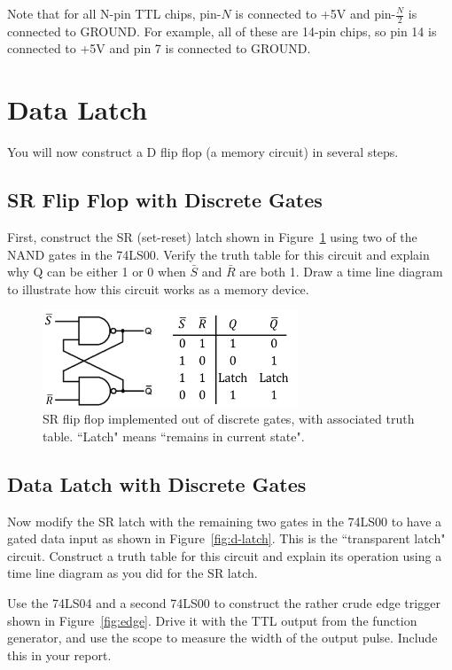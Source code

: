 \documentclass[12pt]{article}
\begin{document}
Note that for all N-pin TTL chips, pin-$N$ is connected to +5V and pin-$\frac N2$ is connected to GROUND.  For example, all of these are 14-pin chips, so pin 14 is connected to +5V and pin 7 is connected to GROUND. 

\section *{Data Latch}

You will now construct a D flip flop (a memory circuit) in several steps.
\subsection*{SR Flip Flop with Discrete Gates}
First, construct the SR (set-reset) latch shown in Figure~\ref{fig:flip-flop} using two of the NAND gates in the 74LS00. Verify the truth table for this circuit and explain why Q can be either 1 or 0 when $\bar S$ and $\bar R$ are both 1. Draw a time line diagram to illustrate how this circuit works as a memory device.


\begin{figure}[!h]
\centerline{\includegraphics[width=3in]{figs/flip-flop.pdf}}
\caption{SR flip flop implemented out of discrete gates, with associated truth table. ``Latch" means 	``remains in current state".}
\label{fig:flip-flop}
\end{figure}

\subsection*{Data Latch with Discrete Gates}

Now modify the SR latch with the remaining two gates in the 74LS00 to have a gated data input as shown in Figure~\ref{fig:d-latch}. This is the ``transparent latch" circuit. Construct a truth table for this circuit and explain its operation using a time line diagram as you did for the SR latch.

Use the 74LS04 and a second 74LS00 to construct the rather crude edge trigger shown in Figure~\ref{fig:edge}. Drive it with the TTL output from the 
function generator, and use the scope to measure the width of the output pulse.  Include this in your report. 
\end{document}
